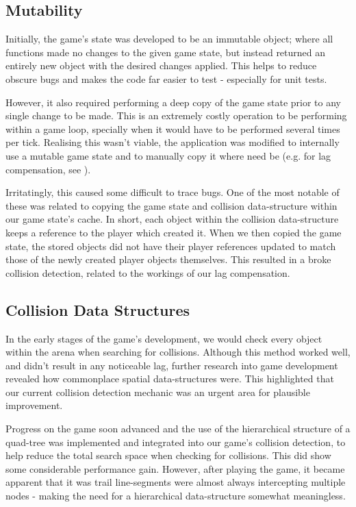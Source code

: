 \documentclass{standalone}
\begin{document}
		\subsection{Mutability}
			Initially, the game's state was developed to be an immutable object; where all functions made no changes to the given game state, but instead returned an entirely new object with the desired changes applied. This helps to reduce obscure bugs and makes the code far easier to test - especially for unit tests.

			However, it also required performing a deep copy of the game state prior to any single change to be made. This is an extremely costly operation to be performing within a game loop, specially when it would have to be performed several times per tick. Realising this wasn't viable, the application was modified to internally use a mutable game state and to manually copy it where need be (e.g. for lag compensation, see ).

			Irritatingly, this caused some difficult to trace bugs. One of the most notable of these was related to copying the game state and collision data-structure within our game state's cache. In short, each object within the collision data-structure keeps a reference to the player which created it. When we then copied the game state, the stored objects did not have their player references updated to match those of the newly created player objects themselves. This resulted in a broke collision detection, related to the workings of our lag compensation.

		\subsection{Collision Data Structures}
			In the early stages of the game's development, we would check every object within the arena when searching for collisions. Although this method worked well, and didn't result in any noticeable lag, further research into game development revealed how commonplace spatial data-structures were. This highlighted that our current collision detection mechanic was an urgent area for plausible improvement.

			Progress on the game soon advanced and the use of the hierarchical structure of a quad-tree was implemented and integrated into our game's collision detection, to help reduce the total search space when checking for collisions. This did show some considerable performance gain. However, after playing the game, it became apparent that it was trail line-segments were almost always intercepting multiple nodes - making the need for a hierarchical data-structure somewhat meaningless.
\end{document}
